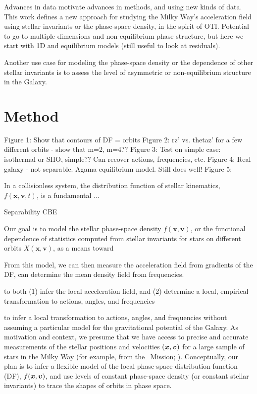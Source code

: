 Advances in data motivate advances in methods, and using new kinds of data.
This work defines a new approach for studying the Milky Way's acceleration field using
stellar invariants or the phase-space density, in the spirit of OTI.
Potential to go to multiple dimensions and non-equilibrium phase structure, but here we
start with 1D and equilibrium models (still useful to look at residuals).

Another use case for modeling the phase-space density or the dependence of other stellar
invariants is to assess the level of asymmetric or non-equilibrium structure in the
Galaxy.


\section{Method} \label{sec:method}


Figure 1: Show that contours of DF = orbits
Figure 2: rz' vs. thetaz' for a few different orbits - show that m=2, m=4??
Figure 3: Test on simple case: isothermal or SHO, simple?? Can recover actions, frequencies, etc.
Figure 4: Real galaxy - not separable. Agama equilibrium model. Still does well!
Figure 5:



In a collisionless system, the distribution function of stellar kinematics,
$f(\boldsymbol{x}, \boldsymbol{v}, t)$, is a fundamental ...

Separability
CBE

Our goal is to model the stellar phase-space density
$f(\boldsymbol{x}, \boldsymbol{v})$, or the functional dependence of statistics computed
from stellar invariants for stars on different orbits $X(\boldsymbol{x},
\boldsymbol{v})$, as a means toward

From this model, we can then measure the acceleration field from gradients of the DF, can determine the mean density field from frequencies.

to both (1) infer the local acceleration field, and (2) determine a local, empirical transformation to actions, angles, and frequencies

to infer a local transformation to actions, angles,
and frequencies without assuming a particular model for the gravitational potential of
the Galaxy.
As motivation and context, we presume that we have access to precise and accurate
measurements of the stellar positions and velocities $(\boldsymbol{x}, \boldsymbol{v})$ for a large
sample of stars in the Milky Way (for example, from the \gaia\ Mission; \citealt{TODO}).
Conceptually, our plan is to infer a flexible model of the local phase-space
distribution function (DF), $f(\boldsymbol{x}, \boldsymbol{v})$, and use levels of constant phase-space
density (or constant stellar invariants) to trace the shapes of orbits in phase space.


